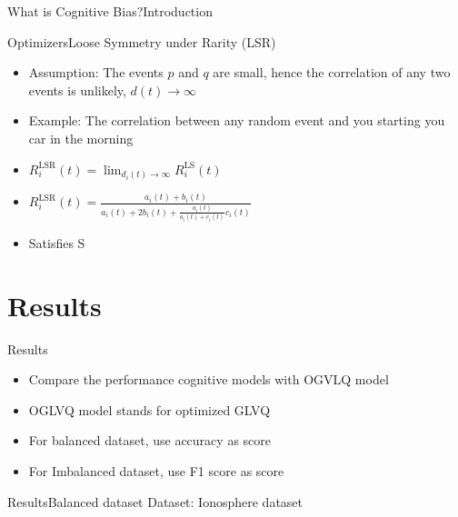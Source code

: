 \documentclass[
	aspectratio=169,	%
	onlytextwidth,		%
	t,					%
	]{beamer}
\begin{document}
\begin{frame}[fragile]{What is Cognitive Bias?}{Introduction}
	\begin{frame}[fragile]{Optimizers}{Loose Symmetry under Rarity (LSR)}

		\begin{itemize}

		\item<1-> Assumption: The events $p$ and $q$ are small, hence the correlation of any two events is unlikely, $d(t) \rightarrow \infty$~\cite{hat07}
		\item <2-> Example: The correlation between any random event and you starting you car in the morning~\cite{hat07}
		\item<3-> $R^{\text{LSR}}_{i}(t) = \lim_{d_{i}(t) \to \infty}R^{\text{LS}}_{i}(t)$
		\vspace{10pt}
		\item<4-> $R^{\text{LSR}}_{i}(t) = \frac{a_{i}(t) 
		+ b_{i}(t)}
		{a_{i}(t) 
		+ 2b_{i}(t) 
		+ \frac{a_{i}(t)}{a_{i}(t) + c_{i}(t)}c_{i}(t)}$~\cite{tak10}
		\vspace{10pt}
		\item<5-> Satisfies S~\cite{tak10}
		\end{itemize}
	\end{frame}
	\section{Results}

	\begin{frame}[T]{Results}

		\begin{itemize}

		\item<1-> Compare the performance cognitive models with OGVLQ model
		\item<2-> OGLVQ model stands for optimized GLVQ~\cite{OGLVQ}
		\item<3-> For balanced dataset, use accuracy as score
		\item<4-> For Imbalanced dataset, use F1 score as score
		\end{itemize}
	\end{frame}
	
	\begin{frame}[fragile]{Results}{Balanced dataset}
		\scriptsize
		Dataset: Ionosphere dataset~\cite{ion} 
		\newline
		
		\begin{columns}
			

\end{columns}
\end{frame}
\end{frame}
\end{document}
